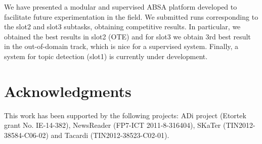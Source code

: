 \documentclass[11pt,letterpaper]{article}
\begin{document}
We have presented a modular and supervised ABSA platform developed to facilitate future experimentation in the field. We submitted runs corresponding to the slot2 and slot3 subtasks, obtaining competitive results. In particular, we obtained the best results in slot2 (OTE) and  for slot3 we obtain 3rd best result in the out-of-domain track, which is nice for a supervised system. Finally, a system for topic detection (slot1) is currently under development.

\section{Acknowledgments}
This work has been supported by the following projects: ADi project (Etortek grant No. IE-14-382), NewsReader (FP7-ICT 2011-8-316404), SKaTer (TIN2012-38584-C06-02) and Tacardi (TIN2012-38523-C02-01).






\end{document}
